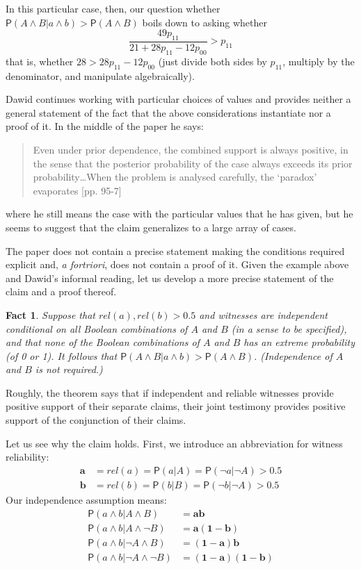 \documentclass[
  10pt,
  dvipsnames,enabledeprecatedfontcommands]{scrartcl}
\newtheorem{fact}{Fact}
\newcommand{\n}{\neg}
\newcommand{\et}{\wedge}
\newcommand{\pr}[1]{\mathsf{P}(#1)}
\begin{document}
In this particular case, then, our question whether
\(\pr{A\et B\vert a\et b}>\pr{A\et B}\) boils down to asking whether
\[\frac{49p_{11}}{21+28p_{11}-12p_{00}}> p_{11}\] that is, whether
\(28 > 28 p_{11}-12p_{00}\) (just divide both sides by \(p_{11}\),
multiply by the denominator, and manipulate algebraically).

Dawid continues working with particular choices of values and provides
neither a general statement of the fact that the above considerations
instantiate nor a proof of it. In the middle of the paper he says:

\begin{quote}
 Even under prior dependence, the combined support is always positive, in the sense that the posterior probability of the case always exceeds its prior probability\dots When the problem is analysed carefully, the `paradox' evaporates [pp. 95-7]\end{quote}

\noindent where he still means the case with the particular values that
he has given, but he seems to suggest that the claim generalizes to a
large array of cases.

The paper does not contain a precise statement making the conditions
required explicit and, \emph{a fortriori}, does not contain a proof of
it. Given the example above and Dawid's informal reading, let us develop
a more precise statement of the claim and a proof thereof.

\begin{fact}\label{ther:increase}
Suppose that  $rel(a),rel(b)>0.5$ and witnesses are independent conditional on all Boolean combinations of $A$ and $B$  (in a sense to be specified), and that none of the Boolean combinations of $A$ and $B$ has an extreme probability (of 0 or 1). It follows that  $\pr{A\et B \vert a\et b}>\pr{A\et B}$. (Independence of $A$ and $B$ is not required.)
\end{fact}

Roughly, the theorem says that if independent and reliable witnesses
provide positive support of their separate claims, their joint testimony
provides positive support of the conjunction of their claims.

Let us see why the claim holds. First, we introduce an abbreviation for
witness reliability:
\begin{align*}\mathbf{a} &=rel(a)=\pr{a\vert A}=\pr{\n a\vert \n A}>0.5\\ 
\mathbf{b} &=rel(b)=\pr{b\vert B}=\pr{\n b\vert \n A}>0.5
\end{align*} Our independence assumption means: \begin{align*}
\pr{a\et b \vert A\et B}  &= \mathbf{ab}\\
\pr{a\et b \vert A\et \n B} & = \mathbf{a(1-b)}\\
\pr{a\et b \vert \n A\et B}  & = \mathbf{(1-a)b}\\
\pr{a\et b \vert \n A\et \n  B}  & = \mathbf{(1-a)(1-b)}
\end{align*}
\end{document}
